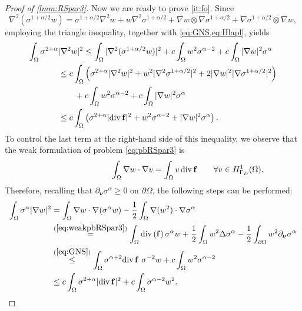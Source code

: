 \documentclass[final,hidelinks]{siamart1116Arxiv}
\numberwithin{theorem}{section}
\newcommand{\Div}{{\rm div}\,}
\newcommand{\normal}{{\boldsymbol \nu}}
\begin{document}
\begin{proof}[Proof of \cref{lmm:RSpar3}]
 Now we are ready to prove \ref{it:fo}. Since
 \begin{equation}
  \nabla^2(\sigma^{1+\alpha/2}w) = \sigma^{1+\alpha/2}\nabla^2w + w\nabla^2\sigma^{1+\alpha/2} + \nabla w\otimes\nabla\sigma^{1+\alpha/2} + \nabla\sigma^{1+\alpha/2}\otimes\nabla w,
 \end{equation}
 employing the triangle inequality, together with \cref{eq:GNS,eq:Hlapl}, yields
 \begin{align}
  \int_\Omega\sigma^{2+\alpha}&|\nabla^2w|^2 \leq \int_\Omega|\nabla^2(\sigma^{1+\alpha/2}w)|^2 + c\int_\Omega w^2\sigma^{\alpha-2} + c\int_\Omega|\nabla w|^2\sigma^\alpha\\
  &\leq c \int_\Omega\left(\sigma^{2+\alpha}|\nabla^2 w|^2 + w^2|\nabla^2\sigma^{1+\alpha/2}|^2 + 2|\nabla w|^2|\nabla\sigma^{1+\alpha/2}|^2\right)\\
    &\qquad + c\int_\Omega w^2\sigma^{\alpha-2} + c\int_\Omega|\nabla w|^2\sigma^\alpha\\
  &\leq c\int_\Omega\left(\sigma^{2+\alpha}|\Div\mathbf f|^2+w^2\sigma^{\alpha-2} + |\nabla w|^2\sigma^\alpha\right).
 \end{align}
 To control the last term at the right-hand side of this inequality, we observe that the weak formulation of problem \cref{eq:pbRSpar3} is 
 \begin{equation}\label{eq:weakpbRSpar3}\phantom{\ref{eq:weakpbRSpar3}}
  \int_\Omega\nabla w\cdot\nabla v = \int_\Omega v\,\Div\mathbf f \qquad \forall v\in H^1_{\Gamma_D}(\Omega).
 \end{equation}
 Therefore, recalling that $\partial_\normal\sigma^\alpha\geq0$ on $\partial\Omega$, the following steps can be performed:
 \begin{equation}\label{eq:sigmanablaw}\begin{aligned}
  \int_\Omega\sigma^\alpha|\nabla w|^2 &= \int_\Omega\nabla w\cdot\nabla(\sigma^\alpha w) - \frac{1}{2}\int_\Omega\nabla(w^2)\cdot\nabla\sigma^\alpha \\
  &\overset{(\ref{eq:weakpbRSpar3})}{=}\int_\Omega\Div(\mathbf f)\,\sigma^\alpha w + \frac{1}{2}\int_\Omega w^2\Delta\sigma^\alpha - \frac{1}{2}\int_{\partial\Omega}w^2\partial_\normal\sigma^\alpha\\
  &\overset{(\ref{eq:GNS})}{\leq} \int_\Omega\sigma^{\alpha+2}\Div\mathbf f\ \sigma^{-2}w + c\int_\Omega w^2\sigma^{\alpha-2}\\
  &\leq c\int_\Omega\sigma^{2+\alpha}|\Div\mathbf f|^2 + c\int_\Omega\sigma^{\alpha-2}w^2.
 \end{aligned}\end{equation}

\end{proof}
\end{document}

